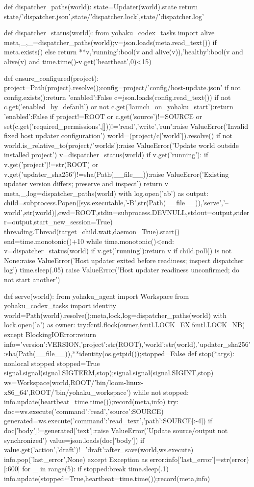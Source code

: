 def dispatcher_paths(world):
 state=Updater(world).state
 return state/'dispatcher.json',state/'dispatcher.lock',state/'dispatcher.log'

def dispatcher_status(world):
 from yohaku_codex_tasks import alive
 meta,_,_=dispatcher_paths(world);v=json.loads(meta.read_text()) if meta.exists() else {}
 return {**v,'running':bool(v and alive(v)),'healthy':bool(v and alive(v) and time.time()-v.get('heartbeat',0)<15)}

def ensure_configured(project):
 project=Path(project).resolve();config=project/'config/host-update.json'
 if not config.exists():return {'enabled':False}
 c=json.loads(config.read_text())
 if not c.get('enabled_by_default') or not c.get('launch_on_yohaku_start'):return {'enabled':False}
 if project!=ROOT or c.get('source')!=SOURCE or set(c.get('required_permissions',[]))!={'read','write','run'}:raise ValueError('Invalid fixed host updater configuration')
 world=(project/c['world']).resolve()
 if not world.is_relative_to(project/'worlds'):raise ValueError('Update world outside installed project')
 v=dispatcher_status(world)
 if v.get('running'):
  if v.get('project')!=str(ROOT) or v.get('updater_sha256')!=sha(Path(__file__)):raise ValueError('Existing updater version differs; preserve and inspect')
  return v
 meta,_,log=dispatcher_paths(world)
 with log.open('ab') as output:
  child=subprocess.Popen([sys.executable,'-B',str(Path(__file__)),'serve','--world',str(world)],cwd=ROOT,stdin=subprocess.DEVNULL,stdout=output,stderr=output,start_new_session=True)
 threading.Thread(target=child.wait,daemon=True).start()
 end=time.monotonic()+10
 while time.monotonic()<end:
  v=dispatcher_status(world)
  if v.get('running'):return v
  if child.poll() is not None:raise ValueError('Host updater exited before readiness; inspect dispatcher log')
  time.sleep(.05)
 raise ValueError('Host updater readiness unconfirmed; do not start another')

def serve(world):
 from yohaku_agent import Workspace
 from yohaku_codex_tasks import identity
 world=Path(world).resolve();meta,lock,log=dispatcher_paths(world)
 with lock.open('a') as owner:
  try:fcntl.flock(owner,fcntl.LOCK_EX|fcntl.LOCK_NB)
  except BlockingIOError:return
  info={'version':VERSION,'project':str(ROOT),'world':str(world),'updater_sha256':sha(Path(__file__)),**identity(os.getpid())};stopped=False
  def stop(*args):
   nonlocal stopped
   stopped=True
  signal.signal(signal.SIGTERM,stop);signal.signal(signal.SIGINT,stop)
  ws=Workspace(world,ROOT/'bin/loom-linux-x86_64',ROOT/'bin/yohaku_workspace')
  while not stopped:
   info.update(heartbeat=time.time());record(meta,info)
   try:
    doc=ws.execute({'command':'read','source':SOURCE})
    generated=ws.execute({'command':'read_text','path':SOURCE[:-4]})
    if doc['body']!=generated['text']:raise ValueError('Update source/output not synchronized')
    value=json.loads(doc['body'])
    if value.get('action','draft')!='draft':after_save(world,ws.execute)
    info.pop('last_error',None)
   except Exception as error:info['last_error']=str(error)[:600]
   for _ in range(5):
    if stopped:break
    time.sleep(.1)
  info.update(stopped=True,heartbeat=time.time());record(meta,info)

